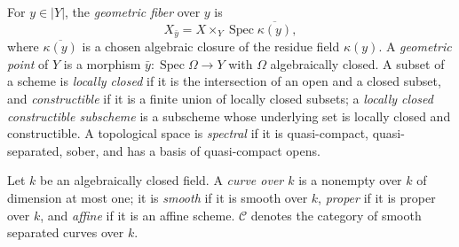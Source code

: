 \begin{definition}
For \(y\in|Y|\), the \emph{geometric fiber} over \(y\) is
\[
 X_{\bar y}=X\times_Y\operatorname{Spec}\overline{\kappa(y)},
\]
where \(\overline{\kappa(y)}\) is a chosen algebraic closure of the
residue field \(\kappa(y)\).  A \emph{geometric point} of \(Y\) is a
morphism \(\bar y:\operatorname{Spec}\Omega\to Y\) with \(\Omega\)
algebraically closed.  A subset of a scheme is \emph{locally closed} if
it is the intersection of an open and a closed subset, and
\emph{constructible} if it is a finite union of locally closed subsets;
a \emph{locally closed constructible subscheme} is a subscheme whose
underlying set is locally closed and constructible.  A topological space
is \emph{spectral} if it is quasi-compact, quasi-separated, sober, and
has a basis of quasi-compact opens.
\end{definition}

\begin{definition}
\label{def:pcb-curves}
Let \(k\) be an algebraically closed field.  A \emph{curve over
\(k\)} is a nonempty  over \(k\) of dimension at most one; it is
\emph{smooth} if it is smooth over \(k\), \emph{proper} if it is
proper over \(k\), and \emph{affine} if it is an affine scheme.
\(\mathcal C\) denotes the category of smooth separated curves over
\(k\).
\end{definition}

